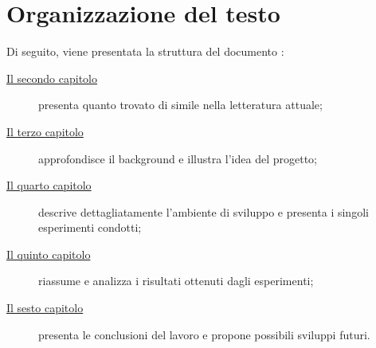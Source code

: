 \section{Organizzazione del testo}
\indent Di seguito, viene presentata la struttura del documento :
\begin{description}
    \item[{\hyperref[cap:RelatedWorks]{Il secondo capitolo}}] presenta quanto trovato di simile nella letteratura attuale;

    \item[{\hyperref[cap:descrizione]{Il terzo capitolo}}] approfondisce il background e illustra l'idea del progetto;
    
    \item[{\hyperref[cap:processi-metodologie]{Il quarto capitolo}}] descrive dettagliatamente l'ambiente di sviluppo e presenta i singoli esperimenti condotti;

    \item[{\hyperref[cap:risultati]{Il quinto capitolo}}] riassume e analizza i risultati ottenuti dagli esperimenti;
    
    \item[{\hyperref[cap:conclusioni]{Il sesto capitolo}}] presenta le conclusioni del lavoro e propone possibili sviluppi futuri.
\end{description}
